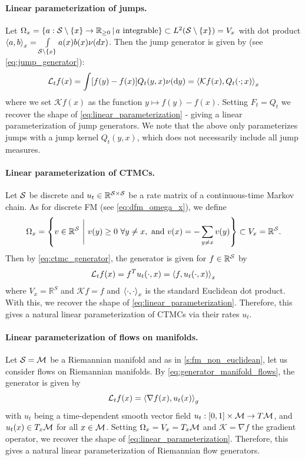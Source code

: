 \documentclass{fairmeta}
\numberwithin{equation}{section}
\begin{document}
\paragraph{Linear parameterization of jumps.} Let $\Omega_{x}=\{a:{\mathcal{S}}\setminus\{x\}\to \mathbb{R}_{\geq 0}\, |\,  a\text{ integrable}\}\subset L^2({\mathcal{S}}\setminus\{x\})=V_{x}$ with dot product $\left \langle a,b \right \rangle_{x}=\int\limits_{{\mathcal{S}}\setminus\{x\}}a(x)b(x)\nu(dx)$. Then the jump generator is given by (see \cref{eq:jump_generator}): 
\begin{align}
\label{e:linear_parameterization_jump}
    \mathcal{L}_tf(x)=\int [f(y)-f(x)] Q_t(y,x)\nu(\mathrm{d} y)
=\left \langle \mathcal{K}f(x),Q_t(\cdot;x) \right \rangle_{x}
\end{align}
where we set $\mathcal{K}f(x)$ as the function $y\mapsto f(y)-f(x)$. Setting $F_t=Q_t$ we recover the shape of \cref{eq:linear_parameterization} - giving a linear parameterization of jump generators. We note that the above only parameterizes jumps with a jump kernel $Q_t(y,x)$, which does not necessarily include all jump measures.

\paragraph{Linear parameterization of CTMCs.}Let ${\mathcal{S}}$ be discrete and $u_t\in \mathbb{R}^{{\mathcal{S}} \times {\mathcal{S}}}$ be a rate matrix of a continuous-time Markov chain. As for discrete FM (see \cref{eq:dfm_omega_x}), we define
\begin{equation}
    \Omega_x = \left\{ v\in \mathbb R^{{\mathcal{S}}} \ \Bigg\vert \  v(y)\geq 0 \ \forall  y\ne x, \text{ and } v(x)=-\sum_{y\ne x} v(y) \right\} \subset V_{x}=\mathbb R^{\mathcal{S}}.
\end{equation}
Then by \cref{eq:ctmc_generator}, the generator is given for $f\in \mathbb{R}^{{\mathcal{S}}}$ by
\begin{align}
\mathcal{L}_tf(x)=f^Tu_t(\cdot,x)=\left \langle f,u_t(\cdot,x) \right \rangle_{x}
\end{align}
where $V_{x}=\mathbb{R}^{S}$ and $\mathcal{K}f=f$ and $\left \langle \cdot,\cdot \right \rangle_{x}$ is the standard Euclidean dot product. With this, we recover the shape of \cref{eq:linear_parameterization}. Therefore, this gives a natural linear parameterization of CTMCs via their rates $u_t$.

\paragraph{Linear parameterization of flows on manifolds.} Let ${\mathcal{S}}={\mathcal{M}}$ be a Riemannian manifold and as in \cref{s:fm_non_euclidean}, let us consider flows on Riemannian manifolds. By \cref{eq:generator_manifold_flows}, the generator is given by
\begin{align}
\label{eq:linear_param_generator_manifold}
\mathcal{L}_tf(x)=\left \langle \nabla f(x), u_t(x) \right \rangle_{g}
\end{align}
with $u_t$ being a time-dependent smooth vector field $u_t :[0,1]\times {\mathcal{M}}\rightarrow T{\mathcal{M}}$, and $u_t(x)\in T_x{\mathcal{M}}$ for all $x\in{\mathcal{M}}$. Setting $\Omega_{x}=V_{x}=T_x{\mathcal{M}}$ and $\mathcal{K}=\nabla f$ the gradient operator,  we recover the shape of \cref{eq:linear_parameterization}. Therefore, this gives a natural linear parameterization of Riemannian flow generators.
\end{document}
